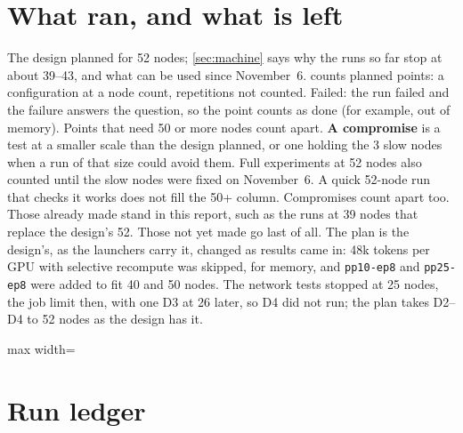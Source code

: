 \section{What ran, and what is left}
\label{app:plan}

The design planned for 52 nodes; \cref{sec:machine} says why the runs so far stop at about 39--43, and what can be used since November~6.  counts planned points: a configuration at a node count, repetitions not counted. Failed: the run failed and the failure answers the question, so the point counts as done (for example, out of memory). Points that need 50 or more nodes count apart. \textbf{A compromise} is a test at a smaller scale than the design planned, or one holding the 3 slow nodes when a run of that size could avoid them. Full experiments at 52 nodes also counted until the slow nodes were fixed on November~6. A quick 52-node run that checks it works does not fill the 50+ column. Compromises count apart too. Those already made stand in this report, such as the runs at 39 nodes that replace the design's 52. Those not yet made go last of all. The plan is the design's, as the launchers carry it, changed as results came in: 48k tokens per GPU with selective recompute was skipped, for memory, and \texttt{pp10-ep8} and \texttt{pp25-ep8} were added to fit 40 and 50 nodes. The network tests stopped at 25 nodes, the job limit then, with one D3 at 26 later, so D4 did not run; the plan takes D2--D4 to 52 nodes as the design has it.

\begin{table}[h]
  \caption{Planned points against what ran, at the time this report was generated.}
  \label{tab:progress}
  \centering\small
  \begin{adjustbox}{max width=\linewidth}
  \end{adjustbox}
\end{table}

\section{Run ledger}
\label{app:ledger}

